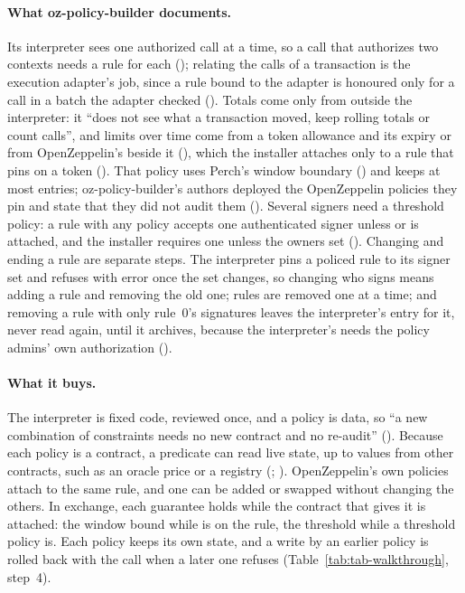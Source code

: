 \paragraph{What oz-policy-builder documents.} Its interpreter sees one authorized call at a
time, so a call that authorizes two contexts needs a rule for each
(); relating the calls of a transaction is the
execution adapter's job, since a rule bound to the adapter is honoured only for a
call in a batch the adapter checked (). Totals come
only from outside the interpreter: it ``does not see what a transaction moved,
keep rolling totals or count calls'', and limits over time come from a token
allowance and its expiry or from OpenZeppelin's  beside it
(), which the installer attaches only to a rule that
pins  on a token ().
That policy uses Perch's window boundary () and keeps at
most  entries; oz-policy-builder's authors deployed
the OpenZeppelin policies they pin and state that they did not audit them
(). Several signers need a threshold policy: a
rule with any policy accepts one authenticated signer unless
 or  is attached, and the
installer requires one unless the owners set 
(). Changing and ending a rule are separate steps. The
interpreter pins a policed rule to its signer set and refuses with error
 once the set changes, so changing who signs means
adding a rule and removing the old one; rules are removed one at a time; and
removing a rule with only rule~0's signatures leaves the interpreter's entry for
it, never read again, until it archives, because the interpreter's
 needs the policy admins' own authorization
().

\paragraph{What it buys.} The interpreter is fixed code, reviewed once, and a
policy is data, so ``a new combination of constraints needs no new contract and
no re-audit'' (). Because each policy is a contract, a
predicate can read live state, up to  values from
other contracts, such as an oracle price or a registry
(; ). OpenZeppelin's own policies
attach to the same rule, and one can be added or swapped without changing the
others. In
exchange, each guarantee holds while the contract that gives it is attached: the
window bound while  is on the rule, the threshold while a
threshold policy is. Each policy keeps its own state, and a write by an earlier
policy is rolled back with the call when a later one refuses
(Table~\ref{tab:tab-walkthrough}, step~4).

